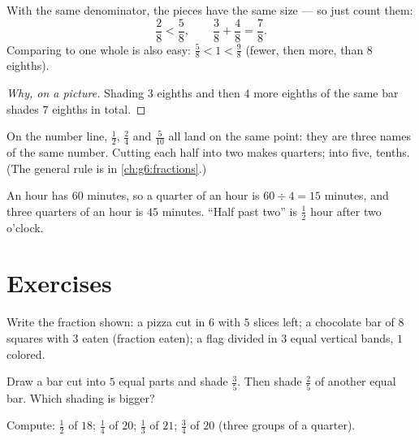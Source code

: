 \begin{proposition}\label{prop:g4:fractions:compare}
With the same denominator, the pieces have the same size --- so just
count them:
\[
\frac{2}{8} < \frac{5}{8},
\qquad
\frac{3}{8} + \frac{4}{8} = \frac{7}{8}.
\]
Comparing to one whole is also easy: $\frac{5}{8} < 1 < \frac{9}{8}$
(fewer, then more, than $8$ eighths).
\end{proposition}

\begin{proof}[Why, on a picture]
Shading $3$ eighths and then $4$ more eighths of the same bar shades
$7$ eighths in total.
\end{proof}

\begin{example}\label{ex:g4:fractions:equal}
On the number line, $\frac12$, $\frac24$ and $\frac{5}{10}$ all land
on the same point: they are three names of the same number. Cutting
each half into two makes quarters; into five, tenths. (The general
rule is in \cref{ch:g6:fractions}.)
\end{example}

\begin{example}\label{ex:g4:fractions:hour}
An hour has $60$ minutes, so a quarter of an hour is
$60 \div 4 = 15$ minutes, and three quarters of an hour is
$45$ minutes. ``Half past two'' is $\frac12$ hour after two
o'clock.
\end{example}

\section{Exercises}

\begin{exercise}[$\star$]\label{exo:g4:fractions:1}
Write the fraction shown: a pizza cut in $6$ with $5$ slices left;
a chocolate bar of $8$ squares with $3$ eaten (fraction eaten); a
flag divided in $3$ equal vertical bands, $1$ colored.
\end{exercise}

\begin{exercise}[$\star$]\label{exo:g4:fractions:2}
Draw a bar cut into $5$ equal parts and shade $\frac35$. Then shade
$\frac{2}{5}$ of another equal bar. Which shading is bigger?
\end{exercise}

\begin{exercise}[$\star$]\label{exo:g4:fractions:3}
Compute: $\frac12$ of $18$; \quad $\frac14$ of $20$; \quad
$\frac13$ of $21$; \quad $\frac34$ of $20$ (three groups of a
quarter).
\end{exercise}

